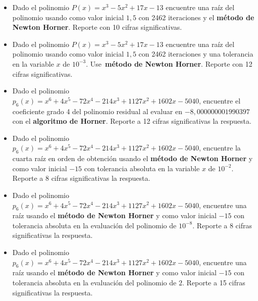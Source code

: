 \documentclass[12pt]{article}
\begin{document}
\begin{itemize}
\item Dado el polinomio \(P(x) = x^3 - 5x^2 + 17x -13\) encuentre una raíz del polinomio usando como valor inicial \(1{,}5\) con 2462 iteraciones y el \textbf{método de Newton Horner}. Reporte con 10 cifras significativas.
\item Dado el polinomio \(P(x) = x^3 - 5x^2 + 17x -13\) encuentre una raíz del polinomio usando como valor inicial \(1{,}5\) con 2462 iteraciones y una tolerancia en la variable \(x\) de \(10^{-3}\). Use \textbf{método de Newton Horner}. Reporte con 12 cifras significativas.
\item Dado el polinomio \(p_6(x)=x^6+4x^5-72x^4-214x^3+1127x^2+1602x-5040\), encuentre el coeficiente grado 4 del polinomio residual al evaluar en \(-8{,}000000001990397\) con el \textbf{algoritmo de Horner}. Reporte a 12 cifras significativas la respuesta.
\item Dado el polinomio \(p_6(x)=x^6+4x^5-72x^4-214x^3+1127x^2+1602x-5040\), encuentre la cuarta raíz en orden de obtención usando el \textbf{método de Newton Horner} y como valor inicial \(-15\) con tolerancia absoluta en la variable \(x\) de \(10^{-2}\). Reporte a 8 cifras significativas la respuesta.
\item Dado el polinomio \(p_6(x)=x^6+4x^5-72x^4-214x^3+1127x^2+1602x-5040\), encuentre una raíz usando el \textbf{método de Newton Horner} y como valor inicial \(-15\) con tolerancia absoluta en la evaluación del polinomio de \(10^{-8}\). Reporte a 8 cifras significativas la respuesta.
\item Dado el polinomio \(p_6(x)=x^6+4x^5-72x^4-214x^3+1127x^2+1602x-5040\), encuentre una raíz usando el \textbf{método de Newton Horner} y como valor inicial \(-15\) con tolerancia absoluta en la evaluación del polinomio de \(2\). Reporte a 15 cifras significativas la respuesta.
\end{itemize}
\end{document}
